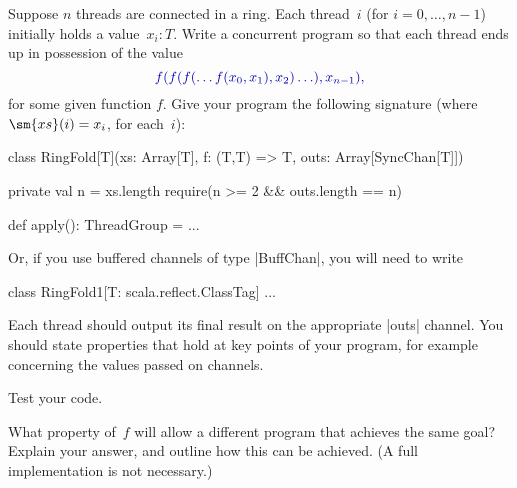 \begin{question}
\label{ex:ringFold}
Suppose $n$ threads are connected in a ring.  Each thread~$i$ (for $i = 0,
\ldots, n-1$) initially holds a value~$x_i: T$.  Write a concurrent program so
that each thread ends up in possession of the value
\[\mstyle
f(f(f(\ldots f(x_0, x_1), x_2) \ldots ), x_{n-1}),
\]
for some given function $f$.
Give your program the following signature (where $\sm{xs}(i) = x_i$, for
each~$i$):
%
\begin{mysamepage}
\begin{scala}
class RingFold[T](xs: Array[T], f: (T,T) => T, outs: Array[SyncChan[T]]){  
  private val n = xs.length
  require(n >= 2 && outs.length == n)

  def apply(): ThreadGroup = ...
}
\end{scala}
\end{mysamepage}
%
\noindent
Or, if you use buffered channels of type |BuffChan|, you will need to write 
\begin{scala}
class RingFold1[T: scala.reflect.ClassTag] ...
\end{scala}
%
Each thread should output its final result on the appropriate |outs| channel.
You should state properties that hold at key points of your program, for
example concerning the values passed on channels.

Test your code. 

What property of~$f$ will allow a different program that achieves the same
goal?  Explain your answer, and outline how this can be achieved.  (A full
implementation is not necessary.)
\end{question}


